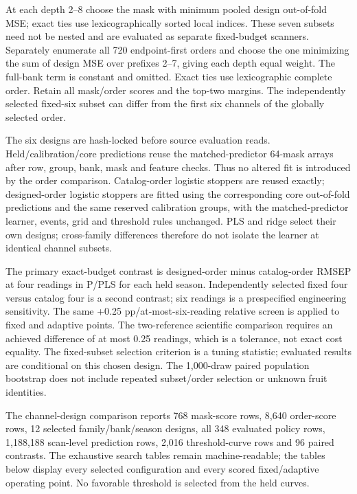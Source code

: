 \documentclass[10pt,a4paper]{article}
\begin{document}
At each depth 2--8 choose the mask with minimum pooled design out-of-fold MSE; exact ties use lexicographically sorted local indices. These seven subsets need not be nested and are evaluated as separate fixed-budget scanners. Separately enumerate all 720 endpoint-first orders and choose the one minimizing the sum of design MSE over prefixes 2--7, giving each depth equal weight. The full-bank term is constant and omitted. Exact ties use lexicographic complete order. Retain all mask/order scores and the top-two margins. The independently selected fixed-six subset can differ from the first six channels of the globally selected order.

The six designs are hash-locked before source evaluation reads. Held/calibration/core predictions reuse the matched-predictor 64-mask arrays after row, group, bank, mask and feature checks. Thus no altered fit is introduced by the order comparison. Catalog-order logistic stoppers are reused exactly; designed-order logistic stoppers are fitted using the corresponding core out-of-fold predictions and the same reserved calibration groups, with the matched-predictor learner, events, grid and threshold rules unchanged. PLS and ridge select their own designs; cross-family differences therefore do not isolate the learner at identical channel subsets.

The primary exact-budget contrast is designed-order minus catalog-order RMSEP at four readings in P/PLS for each held season. Independently selected fixed four versus catalog four is a second contrast; six readings is a prespecified engineering sensitivity. The same +0.25 pp/at-most-six-reading relative screen is applied to fixed and adaptive points. The two-reference scientific comparison requires an achieved difference of at most 0.25 readings, which is a tolerance, not exact cost equality. The fixed-subset selection criterion is a tuning statistic; evaluated results are conditional on this chosen design. The 1,000-draw paired population bootstrap does not include repeated subset/order selection or unknown fruit identities.

The channel-design comparison reports 768 mask-score rows, 8,640 order-score rows, 12 selected family/bank/season designs, all 348 evaluated policy rows, 1,188,188 scan-level prediction rows, 2,016 threshold-curve rows and 96 paired contrasts. The exhaustive search tables remain machine-readable; the tables below display every selected configuration and every scored fixed/adaptive operating point. No favorable threshold is selected from the held curves.
\end{document}

